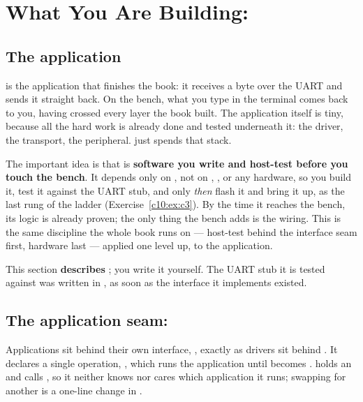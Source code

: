 
\section{What You Are Building: }
\label{c10:sec:echo_node}\label{c10:app:b}

\subsection{The  application}
\label{c10:sec:echo_app}
 is the application that finishes the book: it receives a byte over the UART and
sends it straight back. On the bench, what you type in the terminal comes back to you, having
crossed every layer the book built. The application itself is tiny, because all the hard work is
already done and tested underneath it: the driver, the transport, the peripheral. 
just spends that stack.

The important idea is that  is \textbf{software you write and host-test before you
touch the bench}. It depends only on , not on ,
, or any hardware, so you build it, test it against the UART stub, and only \emph{then}
flash it and bring it up, as the last rung of the ladder (Exercise~\ref{c10:ex:c3}). By the time it
reaches the bench, its logic is already proven; the only thing the bench adds is the wiring. This is
the same discipline the whole book runs on --- host-test behind the interface seam first, hardware
last --- applied one level up, to the application.

This section \textbf{describes} ; you write it yourself. The UART stub it is tested
against was written in , as soon as the interface it implements existed.

\subsection{The application seam: }
\label{c10:sec:app_interface}
Applications sit behind their own interface, , exactly as drivers sit behind
. It declares a single operation, , which
runs the application until  becomes .  holds an
 and calls , so it neither knows nor cares which application it
runs; swapping  for another is a one-line change in .

